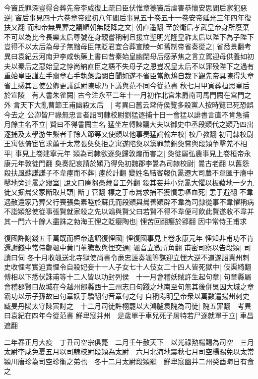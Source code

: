 今竇氏罪深豈得合葬先帝李咸復上疏曰臣伏惟章德竇后虐害恭懷安思閻后家犯惡逆|{
	竇后事見四十六卷章帝建初八年閻后事見五十卷五十一卷安帝延光三年四年復扶又翻}
而和帝無異葬之議順朝無貶降之文|{
	朝直遥翻}
至於衛后孝武皇帝身所廢棄不可以為比今長樂太后尊號在身親嘗稱制且援立聖明光隆皇祚太后以陛下為子陛下豈得不以太后為母子無黜母臣無貶君宜合葬宣陵一如舊制帝省奏從之|{
	省悉景翻考異曰袁紀云河南尹李咸執藥上書曰昔秦始皇幽閉母后感茅焦之言立駕迎母供養如初夫以秦后之惡始皇之悖尚納直臣之語不失母子之恩豈况皇太后不以罪殁陛下之過有重始皇臣謹左手齎章右手執藥詣闕自聞如遂不省臣當飲鴆自裁下覲先帝具陳得失章省上感其言使公卿更議廷尉陳球乃下議與范不同今從范書}
秋七月甲寅葬桓思皇后於宣陵　有人書朱雀闕|{
	古今注永平二年十一月初作北宫朱爵南司馬門闕在宫門之外}
言天下大亂曹節王甫幽殺太后　|{
	考異曰舊云常侍侯覽多殺黨人按時覽已死恐誤今去之}
公卿皆尸祿無忠言者詔司隸校尉劉猛逐捕十日一會猛以誹書言直不肯急捕月餘主名不立|{
	賢曰不得書闕主名}
猛坐左轉諫議大夫以御史中丞段熲代之熲乃四出逐捕及太學游生繫者千餘人節等又使熲以他事奏猛論輸左校|{
	校戶教翻}
初司隸校尉王寓依倚宦官求薦于太常張奐奐拒之寓遂陷奐以黨罪禁銅奐嘗與段熲争擊羌不相平|{
	事見上卷建寧元年}
熲為司隸欲逐奐歸敦煌而害之|{
	奐徙屬弘農事見上卷桓帝永康元年敦徒門翻}
奐奏記哀請於熲乃得免初魏郡李暠為司隸校尉|{
	暠古老翻}
以舊怨殺扶風蘇謙謙子不韋瘞而不葬|{
	瘞於計翻}
變姓名結客報仇暠遷大司農不韋匿于廥中鑿地旁達暠之寢室|{
	說文曰廥芻槀藏音工外翻}
殺其妾并小兒暠大懼以板藉地一夕九徙又掘暠父冢斷取其頭|{
	斷丁管翻}
標之于市暠求捕不獲憤恚嘔血死|{
	恚于避翻}
不韋遇赦還家乃葬父行喪張奐素睦於蘇氏而段熲與暠善熲辟不韋為司隸從事不韋懼稱病不詣熲怒使從事張賢就家殺之先以鴆與賢父曰若賢不得不韋便可飲此賢遂收不韋并其一門六十餘人盡誅之勃海王悝之貶癭陶也|{
	悝苦回翻癭於郢翻}
因中常侍王甫求

復國許謝錢五千萬既而桓帝遺詔復悝國|{
	悝復國事見上卷永康元年}
悝知非甫功不肯還謝錢中常侍鄭颯中黄門董騰數與悝交通|{
	颯音立數所角翻}
甫密司察以告段熲|{
	司讀曰伺}
冬十月收颯送北寺獄使尚書令亷忠誣奏颯等謀迎立悝大逆不道遂詔冀州刺史收悝考實迫責悝令自殺妃妾十一人子女七十人伎女二十四人皆死獄中|{
	伎渠綺翻}
傅相以下悉伏誅甫等十二人皆以功封列侯　十一月會稽妖賊許生起句章|{
	句章縣屬會稽郡賢曰故城在今越州鄮縣西十三州志曰句踐之地南至句無其後併吳因大城之章霸功以示子孫故曰句章妖于驕翻句音章句之句}
自稱陽明皇帝衆以萬數遣揚州刺史臧旻丹陽太守陳寅討之　十二月司徒許栩罷以大鴻臚袁隗為司徒|{
	隗五罪翻　考異曰袁紀在四年今從范書}
鮮卑寇并州　是歲單于車兒死子屠特若尸逐就單于立|{
	車昌遮翻}


二年春正月大疫　丁丑司空宗俱薨　二月壬午赦天下　以光祿勲楊賜為司空　三月太尉李咸免夏五月以司隷校尉段熲為太尉　六月北海地震秋七月司空楊賜免以太常潁川唐珍為司空珍衡之弟也　冬十二月太尉段熲罷　鮮卑寇幽并二州癸酉晦日有食之

